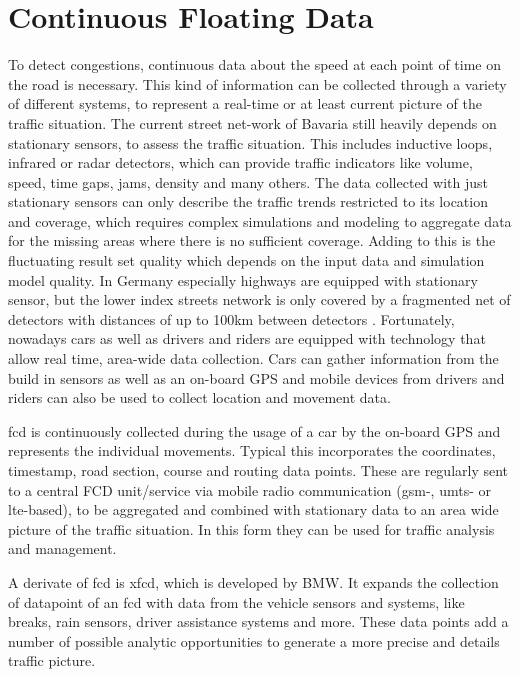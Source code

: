 \documentclass[a4paper,12pt]{report}
\begin{document}
\section{Continuous Floating Data}

\par To detect congestions, continuous data about the speed at each point of time on the road is necessary. This kind of information can be collected through a variety of different systems, to represent a real-time or at least current picture of the traffic situation. The current street net-work of Bavaria still heavily depends on stationary sensors, to assess the traffic situation. This includes inductive loops, infrared or radar detectors, which can provide traffic indicators like volume, speed, time gaps, jams, density and many others. The data collected with just stationary sensors can only describe the traffic trends restricted to its location and coverage, which requires complex simulations and modeling to aggregate data for the missing areas where there is no sufficient coverage. Adding to this is the fluctuating result set quality which depends on the input data and simulation model quality. In Germany especially highways are equipped with stationary sensor, but the lower index streets network is only covered by a fragmented net of detectors with distances of up to 100km between detectors \cite{INDRIX2015}. Fortunately, nowadays cars as well as drivers and riders are equipped with technology that allow real time, area-wide data collection. Cars can gather information from the build in sensors as well as an on-board GPS and mobile devices from drivers and riders can also be used to collect location and movement data. \cite{Randelhoff2016}

\par \acrfull{fcd} is continuously collected during the usage of a car by the on-board GPS and represents the individual movements. Typical this incorporates the coordinates, timestamp, road section, course and routing data points. These are regularly sent to a central FCD unit/service via mobile radio communication (\acrshort{gsm}-, \acrshort{umts}- or \acrshort{lte}-based), to be aggregated and combined with stationary data to an area wide picture of the traffic situation. In this form they can be used for traffic analysis and management. \cite{Randelhoff2016,LAPID2020}

\par A derivate of \acrshort{fcd} is \acrfull{xfcd}, which is developed by BMW. It expands the collection of datapoint of an \acrshort{fcd} with data from the vehicle sensors and systems, like breaks, rain sensors, driver assistance systems and more. These data points add a number of possible analytic opportunities to generate a more precise and details traffic picture. \cite{LAPID2020}
\end{document}
